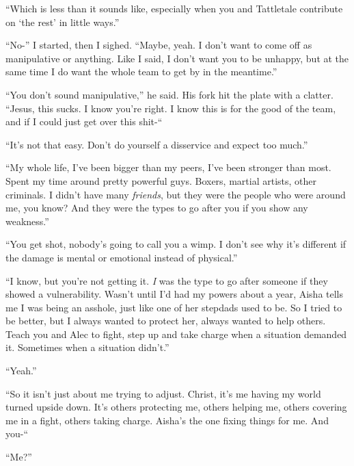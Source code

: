``Which is less than it sounds like, especially when you and Tattletale contribute on `the rest' in little ways.''



``No-'' I started, then I sighed.  ``Maybe, yeah.  I don't want to come off as manipulative or anything.  Like I said, I don't want you to be unhappy, but at the same time I do want the whole team to get by in the meantime.''



``You don't sound manipulative,'' he said.  His fork hit the plate with a clatter.  ``Jesus, this sucks.  I know you're right.  I know this is for the good of the team, and if I could just get over this shit-``



``It's not that easy.  Don't do yourself a disservice and expect too much.''



``My whole life, I've been bigger than my peers, I've been stronger than most.  Spent my time around pretty powerful guys.  Boxers, martial artists, other criminals.  I didn't have many \emph{friends}, but they were the people who were around me, you know?  And they were the types to go after you if you show any weakness.''



``You get shot, nobody's going to call you a wimp.  I don't see why it's different if the damage is mental or emotional instead of physical.''



``I know, but you're not getting it.  \emph{I} was the type to go after someone if they showed a vulnerability.  Wasn't until I'd had my powers about a year, Aisha tells me I was being an asshole, just like one of her stepdads used to be.  So I tried to be better, but I always wanted to protect her, always wanted to help others.  Teach you and Alec to fight, step up and take charge when a situation demanded it.  Sometimes when a situation didn't.''



``Yeah.''



``So it isn't just about me trying to adjust.  Christ, it's me having my world turned upside down.  It's others protecting me, others helping me, others covering me in a fight, others taking charge.  Aisha's the one fixing things for me.  And you-``



``Me?''



